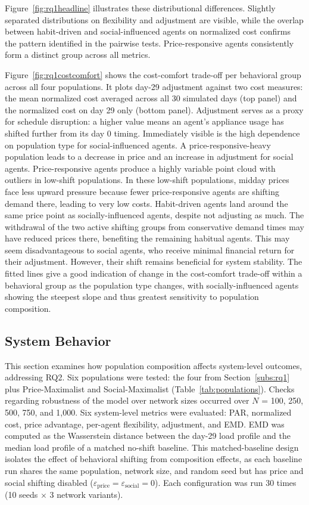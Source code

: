 \documentclass[11pt, a4paper]{article}
\begin{document}
Figure~\ref{fig:rq1headline} illustrates these distributional differences. Slightly separated distributions on flexibility and adjustment are visible, while the overlap between habit-driven and social-influenced agents on normalized cost confirms the pattern identified in the pairwise tests. Price-responsive agents consistently form a distinct group across all metrics.

Figure~\ref{fig:rq1costcomfort} shows the cost-comfort trade-off per behavioral group across all four populations. It plots day-29 adjustment against two cost measures: the mean normalized cost averaged across all 30 simulated days (top panel) and the normalized cost on day 29 only (bottom panel). Adjustment serves as a proxy for schedule disruption: a higher value means an agent's appliance usage has shifted further from its day 0 timing. Immediately visible is the high dependence on population type for social-influenced agents. A price-responsive-heavy population leads to a decrease in price and an increase in adjustment for social agents. Price-responsive agents produce a highly variable point cloud with outliers in low-shift populations. In these low-shift populations, midday prices face less upward pressure because fewer price-responsive agents are shifting demand there, leading to very low costs. Habit-driven agents land around the same price point as socially-influenced agents, despite not adjusting as much. The withdrawal of the two active shifting groups from conservative demand times may have reduced prices there, benefiting the remaining habitual agents. This may seem disadvantageous to social agents, who receive minimal financial return for their adjustment. However, their shift remains beneficial for system stability. The fitted lines give a good indication of change in the cost-comfort trade-off within a behavioral group as the population type changes, with socially-influenced agents showing the steepest slope and thus greatest sensitivity to population composition.

\subsection{System Behavior} \label{subs:rq2}
This section examines how population composition affects system-level outcomes, addressing RQ2. Six populations were tested: the four from Section~\ref{subs:rq1} plus Price-Maximalist and Social-Maximalist (Table~\ref{tab:populations}). Checks regarding robustness of the model over network sizes occurred over $N$ = 100, 250, 500, 750, and 1,000. Six system-level metrics were evaluated: PAR, normalized cost, price advantage, per-agent flexibility, adjustment, and EMD. EMD was computed as the Wasserstein distance between the day-29 load profile and the median load profile of a matched no-shift baseline. This matched-baseline design isolates the effect of behavioral shifting from composition effects, as each baseline run shares the same population, network size, and random seed but has price and social shifting disabled ($\varepsilon_{\text{price}} = \varepsilon_{\text{social}} = 0$). Each configuration was run 30 times (10 seeds $\times$ 3 network variants).
\end{document}
